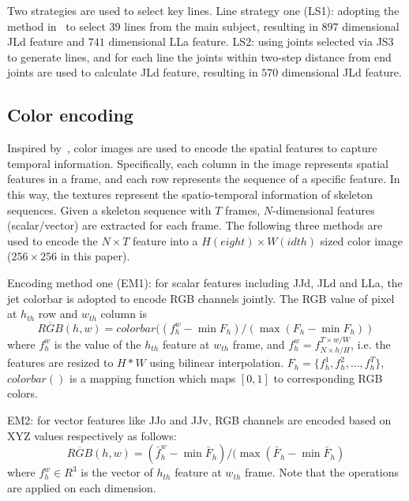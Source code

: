 \documentclass[5pt]{article}
\begin{document}
Two strategies are used to select key lines. Line strategy one (LS1): 
adopting the method in~\cite{Zhang2017} to select 39 lines from the main 
subject, resulting in $897$ dimensional JLd feature and $741$ dimensional LLa 
feature. LS2: using joints selected via JS3 to generate lines, and for each line 
the joints within two-step distance from end joints are used to calculate JLd 
feature, resulting in $ 570$ dimensional JLd feature.
	
\subsection{Color encoding}
Inspired by~\cite{Li2017}, color images are used to encode the spatial 
features to capture temporal information. Specifically, each column in the image 
represents spatial features in a frame, and each row represents the sequence of 
a specific feature. In this way, the textures represent the spatio-temporal 
information of skeleton sequences. Given a skeleton sequence with $T$ frames, 
$N$-dimensional features (scalar/vector) are extracted for each frame. 
The following three methods are used to encode the $N\times T$ feature into a 
$H(eight)\times W(idth)$ sized color image ($256\times256$ in this paper). 
      
      Encoding method one (EM1): for scalar features including JJd, JLd and LLa, 
the jet colorbar \cite{Li2017} is adopted to encode RGB channels jointly. The 
RGB value of pixel at $h_{th}$ row and $w_{th}$ column is 
      \begin{equation}
      \overline{RGB}(h,w) = colorbar((f^w_h-\min F_h)/(\max (F_h-\min F_h))
      \label{equ:colorbar}
      \end{equation}
      where $f^w_h$ is the value of the $h_{th}$ feature at $w_{th}$ frame, and 
$f^w_h = f^{T\times w/W}_{N\times h/H}$, i.e. the features are resized to $H*W$ 
using bilinear interpolation. $F_h=\{f^1_h,f^2_h,...,f^T_h\}$, $colorbar()$ is 
a mapping function which maps $[0,1]$ to corresponding RGB colors. 
      
      EM2: for vector features like JJo and JJv, RGB channels are encoded based 
on XYZ values respectively as follows:
      \begin{equation}
      \overline{RGB}(h,w) = (\bar{f}^w_h-\min \bar{F}_h)/(\max (\bar{F}_h-\min 
\bar{F}_h)
      \label{equ:xyz}
      \end{equation}
      where $f^w_h\in R^3$ is the vector of  $h_{th}$ feature at $w_{th}$ frame. 
Note that the operations are applied on each dimension.
      
\end{document}
